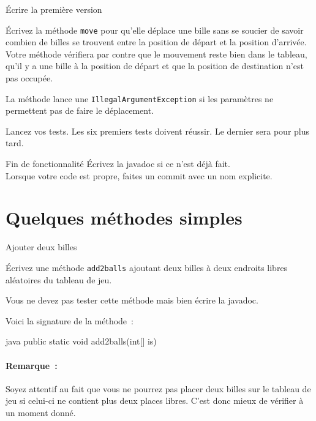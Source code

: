 \documentclass[a4paper,11pt]{style-esi/td}
\newcommand{\findefonctionnalite}{
\begin{infoit}{Fin de fonctionnalité}
	Écrivez la javadoc si ce n'est déjà fait.\\  
	Lorsque votre code est propre, faites un commit avec un nom explicite. 
\end{infoit}
}
\begin{document}
\begin{Exercice}{Écrire la première version}
	\begin{steps}
		\item Écrivez la méthode \texttt{move} pour qu'elle déplace une bille
			sans se soucier de savoir combien de billes se trouvent entre la
			position de départ et la position d'arrivée. Votre méthode
			vérifiera par contre que le mouvement reste bien dans le tableau,
			qu'il y a une bille à la position de départ et que la position 
			de destination n'est pas occupée.

			La méthode lance une \texttt{IllegalArgumentException} si les
			paramètres ne permettent pas de faire le déplacement. 

		\item Lancez vos tests. Les six premiers tests doivent réussir. Le
			dernier sera pour plus tard.
	
\end{steps}
\end{Exercice}

\findefonctionnalite




\section{Quelques méthodes simples}

\begin{Exercice}{Ajouter deux billes}
	\begin{steps}
		\item Écrivez une méthode \texttt{add2balls} ajoutant deux billes à deux 
			endroits libres aléatoires du tableau de jeu. 
	\end{steps}

	Vous ne devez pas tester cette méthode mais bien écrire la javadoc. 

	Voici la signature de la méthode~:

	\begin{Code}{java}
		public static void add2balls(int[] is)
	\end{Code}

	\paragraph{Remarque~:} Soyez attentif au fait que vous ne pourrez pas placer 
	deux billes sur le tableau de jeu si celui-ci ne contient plus deux places 
	libres. C'est donc mieux de vérifier à un moment donné. 

\end{Exercice}
\end{document}
